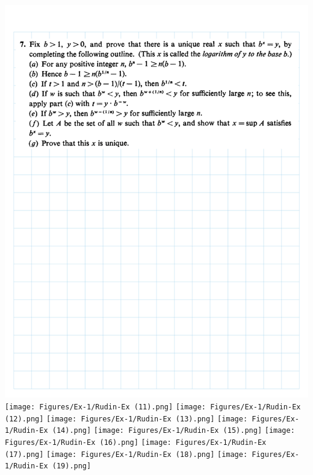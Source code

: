 \documentclass[
]{book}
\theoremstyle{definition}
\theoremstyle{definition}
\theoremstyle{definition}
\theoremstyle{definition}
\theoremstyle{remark}
\begin{document}
\includegraphics{Figures/Ex-1/Rudin-Ex (10).png}
\texttt{[image: Figures/Ex-1/Rudin-Ex (11).png]}
\texttt{[image: Figures/Ex-1/Rudin-Ex (12).png]}
\texttt{[image: Figures/Ex-1/Rudin-Ex (13).png]}
\texttt{[image: Figures/Ex-1/Rudin-Ex (14).png]}
\texttt{[image: Figures/Ex-1/Rudin-Ex (15).png]}
\texttt{[image: Figures/Ex-1/Rudin-Ex (16).png]}
\texttt{[image: Figures/Ex-1/Rudin-Ex (17).png]}
\texttt{[image: Figures/Ex-1/Rudin-Ex (18).png]}
\texttt{[image: Figures/Ex-1/Rudin-Ex (19).png]}
\end{document}
